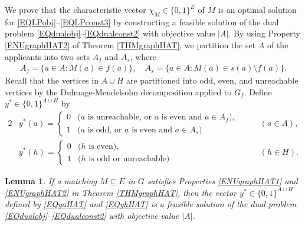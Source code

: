 \documentclass[11pt,a4paper,showkeys]{article}
\theoremstyle{plain}
\newtheorem{lemma}[theorem]{Lemma}
\theoremstyle{definition}
\begin{document}
We prove that the characteristic vector $\chi_M \in \{0,1\}^E$ of $M$ 
is an optimal solution for \eqref{EQLPobj}--\eqref{EQLPconst3} by 
constructing a feasible solution of the dual problem \eqref{EQdualobj}--\eqref{EQdualconst2} with objective value $|A|$. 
By using Property \ref{ENUgraphHAT2} of Theorem \ref{THMgraphHAT}, 
we partition the set $A$ of the applicants into two sets $A_f$ and $A_s$, 
where 
\begin{align*}
    A_f = \{a\in A \colon M(a) \in f(a)\}, \quad A_s = \{a\in A \colon M(a) \in s(a) \setminus f(a)\}. 
\end{align*}
Recall that the vertices in $A\cup H$ 
are partitioned into odd, even, and unreachable vertices by the Dulmage-Mendelsohn  decomposition applied to $G_f$.
Define $y^* \in \{0,1\}^{A\cup H}$ by 
\begin{alignat}{2}
    &{}y^*(a) = 
    \begin{cases}
        0 & \mbox{($a$ is unreachable, or $a$ is even and $a\in A_f$)}, \\
        1 & \mbox{($a$ is odd, or $a$ is even and $a\in A_s$)} 
    \end{cases}
    &\quad& (a\in A),
    \label{EQyaHAT}
    \\
    &{}y^*(h) = 
    \begin{cases}
        0 & \mbox{($h$ is even)}, \\
        1 & \mbox{($h$ is odd or unreachable)} 
    \end{cases}
    &\quad& (h\in H).    
    \label{EQyhHAT}
\end{alignat}

\begin{lemma}
    \label{LEMdualHAT}
    If a matching $M\subseteq E$ in $G$ satisfies Properties \ref{ENUgraphHAT1} and \ref{ENUgraphHAT2} in Theorem \ref{THMgraphHAT}, 
    then the vector $y^*\in \{0,1\}^{A\cup H}$ defined by \eqref{EQyaHAT} and \eqref{EQyhHAT} is a feasible solution of the dual problem \eqref{EQdualobj}--\eqref{EQdualconst2} 
    with objective value $|A|$. 
\end{lemma}
\end{document}
